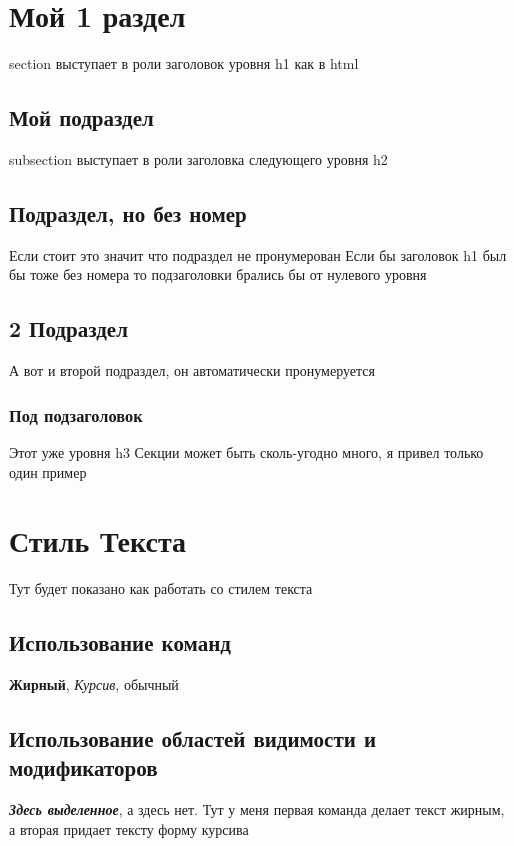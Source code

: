 


    \section{\centering Мой 1 раздел}
        section выступает в роли заголовок уровня h1 как в html
        
        \subsection{Мой подраздел}
            subsection выступает в роли заголовка следующего уровня h2
        
        \subsection*{Подраздел, но без номер}
            Если стоит \* это значит что подраздел не пронумерован
            Если бы заголовок h1 был бы тоже без номера то подзаголовки брались бы от нулевого уровня
        
        \subsection{2 Подраздел}
            А вот и второй подраздел, он автоматически пронумеруется
            
            \subsubsection{Под подзаголовок}
                Этот уже уровня h3
                Секции может быть сколь-угодно много, я привел только один пример
    
    
    \section{\centering Стиль Текста}
        Тут будет показано как работать со стилем текста
        
        \subsection{Использование команд}
            \textbf{Жирный}, \textit{Курсив}, обычный
        
        \subsection{Использование областей видимости и модификаторов}
        {\bfseries \itshape Здесь выделенное}, а здесь нет. Тут у меня первая команда делает текст жирным, а вторая придает тексту форму курсива
    
